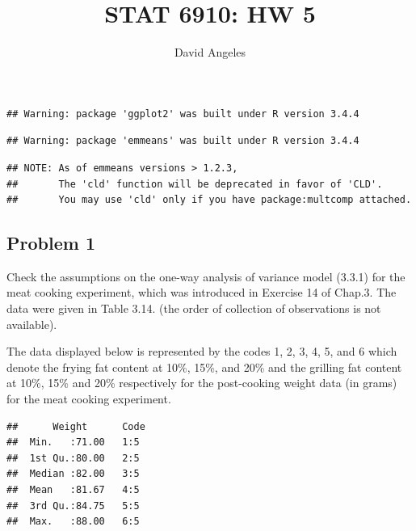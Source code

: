 \documentclass[12pt,]{article}
\title{STAT 6910: HW 5}
\author{David Angeles}
\date{}
\newenvironment{Shaded}{\begin{snugshade}}{\end{snugshade}}
\newcommand{\KeywordTok}[1]{\textcolor[rgb]{0.13,0.29,0.53}{\textbf{#1}}}
\newcommand{\StringTok}[1]{\textcolor[rgb]{0.31,0.60,0.02}{#1}}
\newcommand{\OperatorTok}[1]{\textcolor[rgb]{0.81,0.36,0.00}{\textbf{#1}}}
\newcommand{\NormalTok}[1]{#1}
\begin{document}
\maketitle

\begin{verbatim}
## Warning: package 'ggplot2' was built under R version 3.4.4
\end{verbatim}

\begin{verbatim}
## Warning: package 'emmeans' was built under R version 3.4.4
\end{verbatim}

\begin{verbatim}
## NOTE: As of emmeans versions > 1.2.3,
##       The 'cld' function will be deprecated in favor of 'CLD'.
##       You may use 'cld' only if you have package:multcomp attached.
\end{verbatim}

\subsection{Problem 1}\label{problem-1}

Check the assumptions on the one-way analysis of variance model (3.3.1)
for the meat cooking experiment, which was introduced in Exercise 14 of
Chap.3. The data were given in Table 3.14. (the order of collection of
observations is not available).

The data displayed below is represented by the codes 1, 2, 3, 4, 5, and
6 which denote the frying fat content at 10\%, 15\%, and 20\% and the
grilling fat content at 10\%, 15\% and 20\% respectively for the
post-cooking weight data (in grams) for the meat cooking experiment.

\begin{Shaded}
\end{Shaded}

\begin{verbatim}
##      Weight      Code 
##  Min.   :71.00   1:5  
##  1st Qu.:80.00   2:5  
##  Median :82.00   3:5  
##  Mean   :81.67   4:5  
##  3rd Qu.:84.75   5:5  
##  Max.   :88.00   6:5
\end{verbatim}
\end{document}
